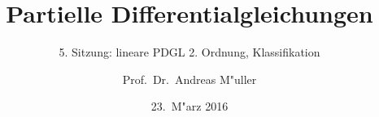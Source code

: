 \documentclass{beamer}
\title[]{Partielle Differentialgleichungen}
\subtitle{5. Sitzung: lineare PDGL 2. Ordnung, Klassifikation}
\date[23.~M"arz 2016]{23.~M"arz 2016}
\author{Prof.~Dr.~Andreas M"uller}
\begin{document}
\begin{frame}
\titlepage
\end{frame}


\end{document}
